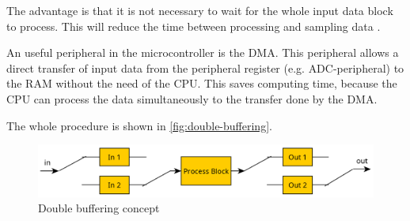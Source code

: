The advantage is that it is not necessary to wait for the whole input data block to process.
This will reduce the time between processing and sampling data \cite{eetimes_fund_dsp}.

An useful peripheral in the microcontroller is the \ac{DMA}. This peripheral allows a
direct transfer of input data from the peripheral register (e.g. \ac{ADC}-peripheral) to the \ac{RAM} 
without the need of the \ac{CPU}. This saves computing time, because the \ac{CPU} can process
the data simultaneously to the transfer done by the \ac{DMA}.

The whole procedure is shown in \autoref{fig:double-buffering}.

\begin{figure}[!h]
    \centering
    \includegraphics[width=13cm]{img/double_buffering.PNG}
    \caption{Double buffering concept \cite{eetimes_fund_dsp}}
    \label{fig:double-buffering}
\end{figure}
